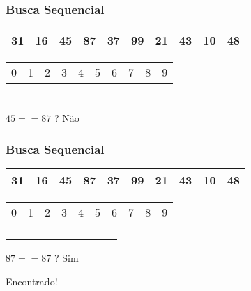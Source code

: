 \documentclass{beamer}
\begin{document}
\begin{frame}
    \frametitle{Busca Sequencial}
    \begin{center}
        \begin{table}
            \begin{tabular}{| p{0.25cm} | p{0.25cm} | p{0.25cm} | p{0.25cm} | p{0.25cm} | p{0.25cm} | p{0.25cm} | p{0.25cm} | p{0.25cm} | p{0.25cm} |}
                \hline
                31 & 16 & 45 & 87 & 37 & 99 & 21 & 43 & 10 & 48 \\ \hline
            \end{tabular}
            \begin{tabular}{p{0.25cm} p{0.25cm} p{0.25cm} p{0.25cm} p{0.25cm} p{0.25cm} p{0.25cm} p{0.25cm} p{0.25cm} p{0.25cm}}
                0 & 1 & 2 & 3 & 4 & 5 & 6 & 7 & 8 & 9
            \end{tabular}
            \begin{tabular}{p{0.25cm} p{0.25cm} p{0.25cm} p{0.25cm} p{0.25cm} p{0.25cm} p{0.25cm} p{0.25cm} p{0.25cm} p{0.25cm}}
                & & \color{red}{$\uparrow$} & & & & & & &
            \end{tabular}
        \end{table}

        $45 == 87$ ? Não
	\end{center}
\end{frame}

\begin{frame}
    \frametitle{Busca Sequencial}
    \begin{center}
        \begin{table}
            \begin{tabular}{| p{0.25cm} | p{0.25cm} | p{0.25cm} | p{0.25cm} | p{0.25cm} | p{0.25cm} | p{0.25cm} | p{0.25cm} | p{0.25cm} | p{0.25cm} |}
                \hline
                31 & 16 & 45 & 87 & 37 & 99 & 21 & 43 & 10 & 48 \\ \hline
            \end{tabular}
            \begin{tabular}{p{0.25cm} p{0.25cm} p{0.25cm} p{0.25cm} p{0.25cm} p{0.25cm} p{0.25cm} p{0.25cm} p{0.25cm} p{0.25cm}}
                0 & 1 & 2 & 3 & 4 & 5 & 6 & 7 & 8 & 9
            \end{tabular}
            \begin{tabular}{p{0.25cm} p{0.25cm} p{0.25cm} p{0.25cm} p{0.25cm} p{0.25cm} p{0.25cm} p{0.25cm} p{0.25cm} p{0.25cm}}
                & & & \color{red}{$\uparrow$} & & & & & &
            \end{tabular}
        \end{table}

        $87 == 87$ ? Sim

        \Large Encontrado!
	\end{center}
\end{frame}
\end{document}
